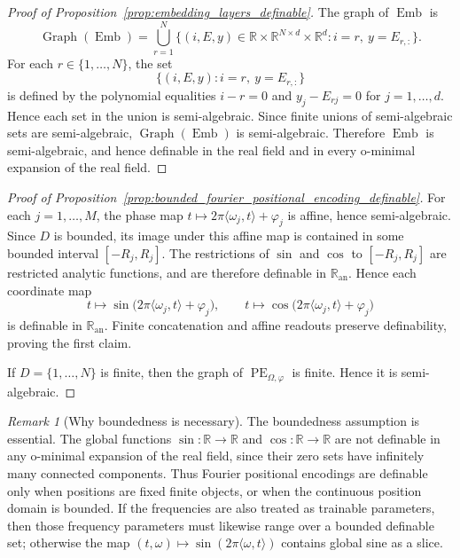 \documentclass{article}
\theoremstyle{plain}
\theoremstyle{definition}
\theoremstyle{remark}
\newtheorem{remark}[theorem]{Remark}
\theoremstyle{plain}
\numberwithin{thm}{section}
\theoremstyle{definition}
\numberwithin{equation}{section}
\begin{document}
\begin{proof}[{Proof of Proposition~\ref{prop:embedding_layers_definable}}]
The graph of $\operatorname{Emb}$ is
\[
    \operatorname{Graph}(\operatorname{Emb})
    =
    \bigcup_{r=1}^N
    \Big\{
        (i,E,y)\in
        \mathbb{R}\times\mathbb{R}^{N\times d}\times\mathbb{R}^d
        :
        i=r,\ y=E_{r,:}
    \Big\}.
\]
For each $r\in\{1,\dots,N\}$, the set
\[
    \Big\{
        (i,E,y):
        i=r,\ y=E_{r,:}
    \Big\}
\]
is defined by the polynomial equalities $i-r=0$ and
$y_j-E_{rj}=0$ for $j=1,\dots,d$.  Hence each set in the union is
semi-algebraic.  Since finite unions of semi-algebraic sets are
semi-algebraic, $\operatorname{Graph}(\operatorname{Emb})$ is semi-algebraic.
Therefore $\operatorname{Emb}$ is semi-algebraic, and hence definable in the
real field and in every o-minimal expansion of the real field.
\end{proof}




\begin{proof}[{Proof of Proposition~\ref{prop:bounded_fourier_positional_encoding_definable}}]
For each $j=1,\dots,M$, the phase map
$
    t\mapsto 2\pi\langle \omega_j,t\rangle+\varphi_j
$
is affine, hence semi-algebraic.  Since $D$ is bounded, its image under this affine map is contained in some bounded interval $[-R_j,R_j]$.  The restrictions of $\sin$ and $\cos$ to $[-R_j,R_j]$ are restricted analytic functions, and are therefore definable in $\mathbb{R}_{\mathrm{an}}$.  Hence each coordinate map
$$
    t\mapsto
        \sin\big(2\pi\langle \omega_j,t\rangle+\varphi_j\big),
    \qquad
    t\mapsto
        \cos\big(2\pi\langle \omega_j,t\rangle+\varphi_j\big)
$$
is definable in $\mathbb{R}_{\mathrm{an}}$.  Finite concatenation and affine readouts preserve definability, proving the first claim.

If $D=\{1,\dots,N\}$ is finite, then the graph of $\operatorname{PE}_{\Omega,\varphi}$ is finite.  Hence it is semi-algebraic.
\end{proof}

\begin{remark}[Why boundedness is necessary]
\label{rmk:global_sine_not_definable}
The boundedness assumption is essential.  The global functions $\sin:\mathbb{R}\to\mathbb{R}$ and $\cos:\mathbb{R}\to\mathbb{R}$ are not definable in any o-minimal expansion of the real field, since their zero sets have infinitely many connected components.  Thus Fourier positional encodings are definable only when positions are fixed finite objects, or when the continuous position domain is bounded.  If the frequencies are also treated as trainable parameters, then those frequency parameters must likewise range over a bounded definable set; otherwise the map $(t,\omega)\mapsto\sin(2\pi\langle\omega,t\rangle)$ contains global sine as a slice.
\end{remark}
\end{document}
